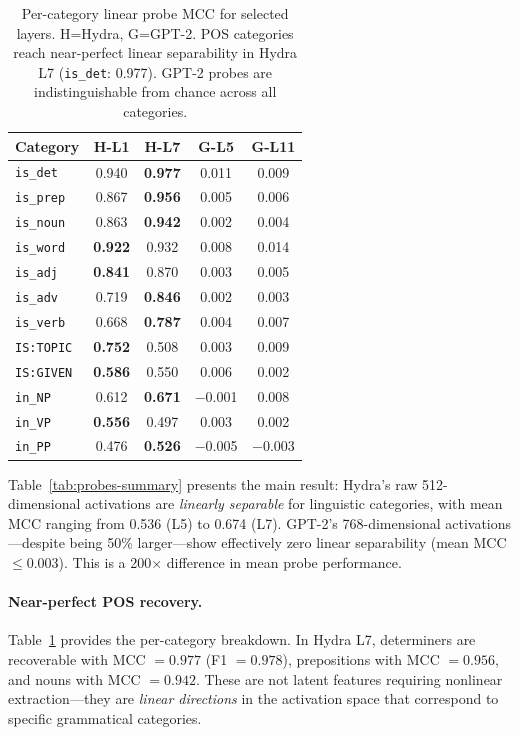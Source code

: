 \documentclass[11pt]{article}
\begin{document}
\begin{table}[t]
\centering
\small
\begin{tabular}{@{}lcccc@{}}
\toprule
\textbf{Category} & \textbf{H-L1} & \textbf{H-L7} & \textbf{G-L5} & \textbf{G-L11} \\
\midrule
\texttt{is\_det}   & 0.940 & \textbf{0.977} & 0.011 & 0.009 \\
\texttt{is\_prep}  & 0.867 & \textbf{0.956} & 0.005 & 0.006 \\
\texttt{is\_noun}  & 0.863 & \textbf{0.942} & 0.002 & 0.004 \\
\texttt{is\_word}  & \textbf{0.922} & 0.932 & 0.008 & 0.014 \\
\texttt{is\_adj}   & \textbf{0.841} & 0.870 & 0.003 & 0.005 \\
\texttt{is\_adv}   & 0.719 & \textbf{0.846} & 0.002 & 0.003 \\
\texttt{is\_verb}  & 0.668 & \textbf{0.787} & 0.004 & 0.007 \\
\texttt{IS:TOPIC}  & \textbf{0.752} & 0.508 & 0.003 & 0.009 \\
\texttt{IS:GIVEN}  & \textbf{0.586} & 0.550 & 0.006 & 0.002 \\
\midrule
\texttt{in\_NP}    & 0.612 & \textbf{0.671} & $-$0.001 & 0.008 \\
\texttt{in\_VP}    & \textbf{0.556} & 0.497 & 0.003 & 0.002 \\
\texttt{in\_PP}    & 0.476 & \textbf{0.526} & $-$0.005 & $-$0.003 \\
\bottomrule
\end{tabular}
\caption{Per-category linear probe MCC for selected layers. H=Hydra, 
G=GPT-2. POS categories reach near-perfect linear separability in 
Hydra L7 (\texttt{is\_det}: 0.977). GPT-2 probes are indistinguishable 
from chance across all categories.}
\label{tab:probes-detail}
\end{table}

Table~\ref{tab:probes-summary} presents the main result: Hydra's raw 
512-dimensional activations are \emph{linearly separable} for linguistic 
categories, with mean MCC ranging from 0.536 (L5) to 0.674 (L7). GPT-2's 
768-dimensional activations---despite being 50\% larger---show effectively 
zero linear separability (mean MCC $\leq 0.003$). This is a 200$\times$ 
difference in mean probe performance.

\paragraph{Near-perfect POS recovery.}
Table~\ref{tab:probes-detail} provides the per-category breakdown. 
In Hydra L7, determiners are recoverable with MCC $= 0.977$ (F1 $= 0.978$), 
prepositions with MCC $= 0.956$, and nouns with MCC $= 0.942$. These are 
not latent features requiring nonlinear extraction---they are \emph{linear 
directions} in the activation space that correspond to specific 
grammatical categories.
\end{document}
